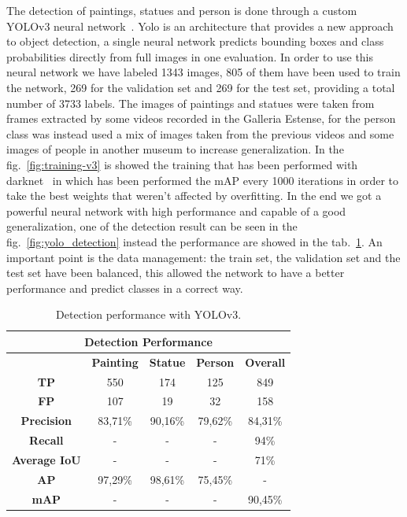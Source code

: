The detection of paintings, statues and person is done through a custom YOLOv3 neural network~\cite{yolov3}.
Yolo is an architecture that provides a new approach to object detection, a single neural network predicts bounding boxes and class probabilities directly from full images in one evaluation.
In order to use this neural network we have labeled 1343 images, 805 of them have been used to train the network, 269 for the validation set and 269 for the test set, providing a total number of 3733 labels. The images of paintings and statues were taken from frames extracted by some videos recorded in the Galleria Estense, for the person class was instead used a mix of images taken from the previous videos and some images of people in another museum to increase generalization.
In the fig.~\ref{fig:training-v3} is showed the training that has been performed with darknet~\cite{darknet} in which has been performed the mAP every 1000 iterations in order to take the best weights that weren't affected by overfitting.
In the end we got a powerful neural network with high performance and capable of a good generalization, one of the detection result can be seen in the fig.~\ref{fig:yolo_detection} instead the performance are showed in the tab.~\ref{tab:detection_performance}.
An important point is the data management: the train set, the validation set and the test set have been balanced, this allowed the network to have a better performance and predict classes in a correct way.



\begin{table}[ht!]
    \centering
\begin{tabular}{|c|c|c|c|c|}
\hline
\multicolumn{5}{|c|}{\textbf{Detection Performance}}       \\ \hline
\multicolumn{1}{|l|}{} & \textbf{Painting} & \textbf{Statue} & \textbf{Person} & \textbf{Overall} \\ \hline
\textbf{TP}        & 550     & 174     & 125     & 849     \\ \hline
\textbf{FP}        & 107     & 19      & 32      & 158     \\ \hline
\textbf{Precision} & 83,71\% & 90,16\% & 79,62\% & 84,31\% \\ \hline
\textbf{Recall}    & -       & -       & -       & 94\%    \\ \hline
\textbf{Average IoU}       & -       & -       & -       & 71\%    \\ \hline
\textbf{AP}        & 97,29\% & 98,61\% & 75,45\% & -       \\ \hline
\textbf{mAP}       & -       & -       & -       & 90,45\% \\ \hline
\end{tabular}
\caption{Detection performance with YOLOv3.}
    \label{tab:detection_performance}
\end{table}



